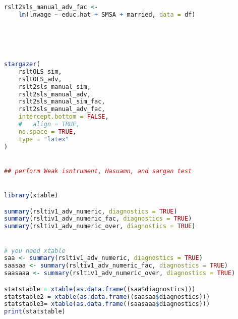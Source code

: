 \documentclass[a4paper]{article}
\begin{document}
\begin{lstlisting}[language=R]
rslt2sls_manual_adv_fac <-
    lm(lnwage ~ educ.hat + SMSA + married, data = df)





stargazer(
    rsltOLS_sim,
    rsltOLS_adv,
    rslt2sls_manual_sim,
    rslt2sls_manual_adv,
    rslt2sls_manual_sim_fac,
    rslt2sls_manual_adv_fac,
    intercept.bottom = FALSE,
    #   align = TRUE,
    no.space = TRUE,
    type = "latex"
)


## perform Weak isntrument, Hasuamn, and sargan test


library(xtable)

summary(rsltiv1_adv_numeric, diagnostics = TRUE)
summary(rsltiv1_adv_numeric_fac, diagnostics = TRUE)
summary(rsltiv1_adv_numeric_over, diagnostics = TRUE)


# you need xtable
saa <- summary(rsltiv1_adv_numeric, diagnostics = TRUE)
saasaa <- summary(rsltiv1_adv_numeric_fac, diagnostics = TRUE)
saasaaa <- summary(rsltiv1_adv_numeric_over, diagnostics = TRUE)

statstable = xtable(as.data.frame((saa$diagnostics)))
statstable2 = xtable(as.data.frame((saasaa$diagnostics)))
statstable3= xtable(as.data.frame((saasaaa$diagnostics)))
print(statstable)



\end{lstlisting}
\end{document}
